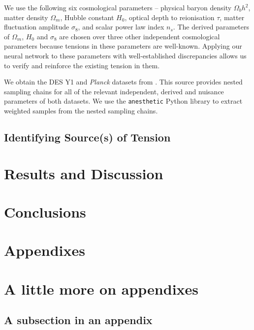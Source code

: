 \documentclass[%
 reprint,
 amsmath,amssymb,
 aps,
]{revtex4-2}
\begin{document}
We use the following six cosmological parameters -- physical baryon density $\Omega_b h^2$, matter density $\Omega_m$, Hubble constant $H_0$, optical depth to reionisation $\tau$, matter fluctuation amplitude $\sigma_8$, and scalar power law index $n_s$. The derived parameters of $\Omega_m$, $H_0$ and $\sigma_8$ are chosen over three other independent cosmological parameters because tensions in these parameters are well-known. Applying our neural network to these parameters with well-established discrepancies allows us to verify and reinforce the existing tension in them.

We obtain the DES Y1 and \textit{Planck} datasets from \cite{Dataset}. This source provides nested sampling chains for all of the relevant independent, derived and nuisance parameters of both datasets. We use the \texttt{anesthetic} Python library \cite{anesthetic} to extract weighted samples from the nested sampling chains.


\subsection{Identifying Source(s) of Tension}


\section{Results and Discussion}

\section{Conclusions}





\begin{acknowledgments}

\end{acknowledgments}

\appendix

\section{Appendixes}

\section{A little more on appendixes}


\subsection{\label{app:subsec}A subsection in an appendix}





\end{document}
